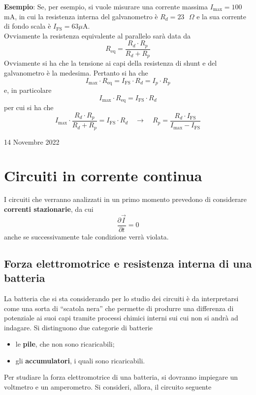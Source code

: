 \documentclass[a4paper]{extarticle}
\newcommand{\quotes}[1]{``#1''}
\begin{document}
\vspace{1em}
\noindent
\textbf{Esempio}: Se, per esempio, si vuole misurare una corrente massima $I_\text{max} = 100$ mA, in cui la resistenza interna del galvanometro è $R_d=23 \text{ } \Omega$ e la sua corrente di fondo scala è $I_\text{FS} = 63 \text{} \mu$A.\\
Ovviamente la resistenza equivalente al parallelo sarà data da
\[R_\text{eq} = \dfrac{R_d \cdot R_p}{R_d + R_p}\]
Ovviamente si ha che la tensione ai capi della resistenza di shunt e del galvanometro è la medesima. Pertanto si ha che
\[I_{\max} \cdot R_\text{eq} = I_\text{FS} \cdot R_d = I_p \cdot R_p\]
e, in particolare
\[I_{\max} \cdot R_\text{eq} = I_\text{FS} \cdot R_d\]
per cui si ha che
\[I_{\max} \cdot \dfrac{R_d \cdot R_p}{R_d + R_p} = I_\text{FS} \cdot R_d \hspace{1em} \rightarrow \hspace{1em} R_p = \dfrac{R_d \cdot I_\text{FS}}{I_{\max} - I_\text{FS}}\]

\newpage
\noindent
\begin{center}
  14 Novembre 2022
\end{center}
\section{Circuiti in corrente continua}
I circuiti che verranno analizzati in un primo momento prevedono di considerare \textbf{correnti stazionarie}, da cui
\[\dfrac{\partial \vec I}{\partial t} = 0\]
anche se successivamente tale condizione verrà violata.

\vspace{1em}
\noindent
\subsection{Forza elettromotrice e resistenza interna di una batteria}
La batteria che si sta considerando per lo studio dei circuiti è da interpretarsi come una sorta di \quotes{scatola nera} che permette di produrre una differenza di potenziale ai suoi capi tramite processi chimici interni sui cui non si andrà ad indagare. Si distinguono due categorie di batterie
\begin{itemize}
  \item le \textbf{pile}, che non sono ricaricabili;
  \item gli \textbf{accumulatori}, i quali sono ricaricabili.
\end{itemize}
Per studiare la forza elettromotrice di una batteria, si dovranno impiegare un voltmetro e un amperometro. Si consideri, allora, il circuito seguente
\end{document}
